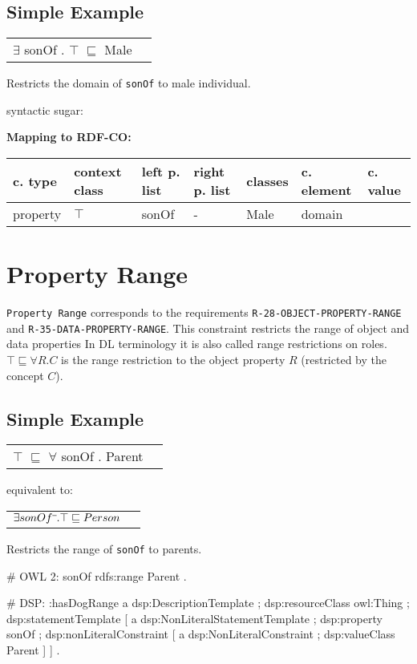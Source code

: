 \documentclass{llncs}
\newcommand{\ms}[1]{\texttt{#1}}
\newenvironment{gcotable}{
  \scriptsize
  \sffamily
  \vspace{0cm}
	\begin{center}
	\textbf{\vspace{0.4cm}Mapping to RDF-CO:} \\
  \begin{tabular}{l|l|l|l|l|l|l}
	\hline
  \textbf{c. type} & \textbf{context class} & \textbf{left p. list} & \textbf{right p. list} & \textbf{classes} & \textbf{c. element} & \textbf{c. value} \\
  \hline

}{
  \hline
  \end{tabular}
	\end{center}
}
\newenvironment{DL}{
  \vspace{0cm}
	\begin{center}
  \begin{tabular}{r l}

}{
  \end{tabular}
	\end{center}
}
\begin{document}
\subsection{Simple Example}

\begin{DL}
$\exists$ sonOf . $\top$ $\sqsubseteq$ Male 
\end{DL}

Restricts the domain of \ms{sonOf} to male individual.

syntactic sugar:

\begin{gcotable}
property & $\top$ & sonOf & - & Male & domain \\
\end{gcotable}

\section{Property Range}

\ms{Property Range} corresponds to the requirements \ms{R-28-OBJECT-PROPERTY-RANGE} and \ms{R-35-DATA-PROPERTY-RANGE}.
This constraint restricts the range of object and data properties
In DL terminology it is also called range restrictions on roles.
$\top \sqsubseteq \forall R . C$ is the range restriction to the object property $R$ (restricted by the concept $C$).  

\subsection{Simple Example}

\begin{DL}
$\top$ $\sqsubseteq$ $\forall$ sonOf . Parent \\
\end{DL}

equivalent to:

\begin{DL}
$\exists sonOf\sp{\overline{\ }}.\top \sqsubseteq Person$
\end{DL}

Restricts the range of \ms{sonOf} to parents.

\begin{ex}
# OWL 2:
sonOf rdfs:range Parent . 
\end{ex}

\begin{ex}
# DSP:
:hasDogRange
        a dsp:DescriptionTemplate ; 
        dsp:resourceClass owl:Thing ; 
        dsp:statementTemplate [
            a dsp:NonLiteralStatementTemplate ;
            dsp:property sonOf ; 
            dsp:nonLiteralConstraint [ 
                a dsp:NonLiteralConstraint ;
                dsp:valueClass Parent ] ] .
\end{ex}
\end{document}
